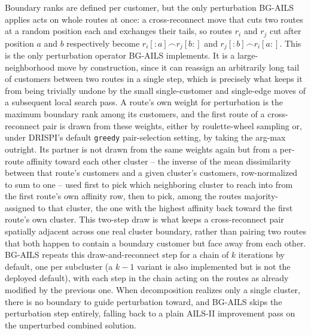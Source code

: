 Boundary ranks are defined per customer, but the only perturbation BG-AILS applies acts on whole routes at once: a cross-reconnect move that cuts two routes at a random position each and exchanges their tails, so routes $r_i$ and $r_j$ cut after position $a$ and $b$ respectively become $r_i[{:}a] \frown r_j[b{:}]$ and $r_j[{:}b] \frown r_i[a{:}]$. This is the only perturbation operator BG-AILS implements. It is a large-neighborhood move by construction, since it can reassign an arbitrarily long tail of customers between two routes in a single step, which is precisely what keeps it from being trivially undone by the small single-customer and single-edge moves of a subsequent local search pass. A route's own weight for perturbation is the maximum boundary rank among its customers, and the first route of a cross-reconnect pair is drawn from these weights, either by roulette-wheel sampling or, under DRISPI's default \texttt{greedy} pair-selection setting, by taking the arg-max outright. Its partner is not drawn from the same weights again but from a per-route affinity toward each other cluster -- the inverse of the mean dissimilarity between that route's customers and a given cluster's customers, row-normalized to sum to one -- used first to pick which neighboring cluster to reach into from the first route's own affinity row, then to pick, among the routes majority-assigned to that cluster, the one with the highest affinity back toward the first route's own cluster. This two-step draw is what keeps a cross-reconnect pair spatially adjacent across one real cluster boundary, rather than pairing two routes that both happen to contain a boundary customer but face away from each other. BG-AILS repeats this draw-and-reconnect step for a chain of $k$ iterations by default, one per subcluster (a $k-1$ variant is also implemented but is not the deployed default), with each step in the chain acting on the routes as already modified by the previous one. When decomposition realizes only a single cluster, there is no boundary to guide perturbation toward, and BG-AILS skips the perturbation step entirely, falling back to a plain AILS-II improvement pass on the unperturbed combined solution.

